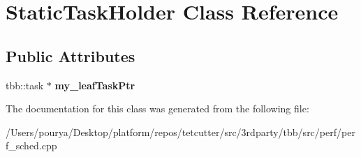 \hypertarget{classStaticTaskHolder}{}\section{Static\+Task\+Holder Class Reference}
\label{classStaticTaskHolder}
\subsection*{Public Attributes}
\begin{DoxyCompactItemize}
\item 
\hypertarget{classStaticTaskHolder_a1dd18ddc21ce22931dcc2289f31fa693}{}tbb\+::task $\ast$ {\bfseries my\+\_\+leaf\+Task\+Ptr}\label{classStaticTaskHolder_a1dd18ddc21ce22931dcc2289f31fa693}

\end{DoxyCompactItemize}


The documentation for this class was generated from the following file\+:\begin{DoxyCompactItemize}
\item 
/\+Users/pourya/\+Desktop/platform/repos/tetcutter/src/3rdparty/tbb/src/perf/perf\+\_\+sched.\+cpp\end{DoxyCompactItemize}
